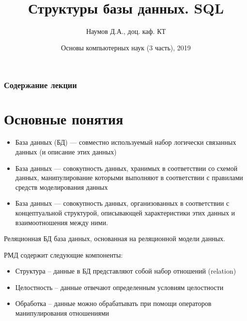\documentclass{beamer}
\title[СУБД]{Структуры базы данных. SQL}
\author{Наумов Д.А., доц. каф. КТ}
\date[22.03.2019] {Основы компьютерных наук (3 часть), 2019}
\begin{document}
\begin{frame}
  \titlepage
\end{frame}
  
\begin{frame}
  \frametitle{Содержание лекции}
  \tableofcontents  
\end{frame}
  
\section{Основные понятия}
\begin{frame}
\begin{itemize}
\item База данных (БД) — совместно используемый набор логически связанных данных (и описание этих данных)
\item База данных — совокупность данных, хранимых в соответствии со схемой данных, манипулирование которыми выполняют в соответствии с правилами средств моделирования данных 
\item База данных — совокупность данных, организованных в соответствии с концептуальной структурой, описывающей характеристики этих данных и взаимоотношения между ними.
\end{itemize}

\end{frame} 

\begin{frame}
\begin{block}{Реляционная БД}
база данных, основанная на реляционной модели данных.
\end{block}

РМД содержит следующие компоненты:
\begin{itemize}
\item Структура – данные в БД представляют собой набор
отношений (relation) 
\item Целостность – данные отвечают определенным условиям целостности
\item Обработка – данные можно обрабатывать при помощи операторов манипулирования отношениями
\end{itemize}
\end{frame} 
\end{document}
